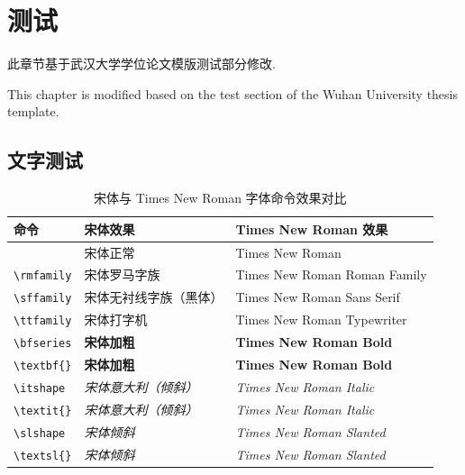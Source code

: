 \chapter{测试\the\baselineskip}

此章节基于武汉大学学位论文模版测试部分修改. \the\baselineskip

This chapter is modified based on the test section of the Wuhan University thesis template.

\section{文字测试\the\baselineskip}\label{sec:fonttest}

\begin{table}[!ht]\centering
    \begin{tabular}{lll}
        \toprule
        命令               & 宋体效果                    & Times New Roman 效果                       \\
        \midrule
                         & 宋体正常                    & Times New Roman                          \\
        \verb|\rmfamily| & {\rmfamily 宋体罗马字族}      & {\rmfamily Times New Roman Roman Family} \\
        \verb|\sffamily| & {\sffamily 宋体无衬线字族（黑体）} & {\sffamily Times New Roman Sans Serif}   \\
        \verb|\ttfamily| & {\ttfamily 宋体打字机}       & {\ttfamily Times New Roman Typewriter}   \\
        \verb|\bfseries| & {\bfseries 宋体加粗}        & {\bfseries Times New Roman Bold}         \\
        \verb|\textbf{}| & \textbf{宋体加粗}           & \textbf{Times New Roman Bold}            \\
        \verb|\itshape|  & {\itshape 宋体意大利（倾斜）}    & {\itshape Times New Roman Italic}        \\
        \verb|\textit{}| & \textit{宋体意大利（倾斜）}      & \textit{Times New Roman Italic}          \\
        \verb|\slshape|  & {\slshape 宋体倾斜}         & {\slshape Times New Roman Slanted}       \\
        \verb|\textsl{}| & \textsl{宋体倾斜}           & \textsl{Times New Roman Slanted}         \\

        \bottomrule
    \end{tabular}
    \caption{宋体与 Times New Roman 字体命令效果对比}
\end{table}
